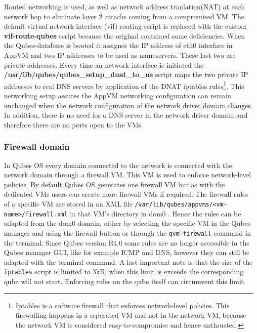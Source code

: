 \documentclass[runningheads,a4paper]{article}
\begin{document}
Routed networking is used, as well as  network address tranlation(NAT)
at each network hop to eliminate layer 2 attacks coming from a
compromised VM. The default virtual network interface (vif) routing
script is replaced with the custom \textbf{vif-route-qubes} script
because the original contained some deficiencies. When the
Qubes-database is booted it assignes the IP address of eth0 interface
in AppVM and two IP addresses to be used as nameservers. These last
two are private addresses. Every time an network interface is
initiated the \textbf{/usr/lib/qubes/qubes\_setup\_dnat\_to\_ns} script
maps the two private IP addresses to real DNS servers by application
of the DNAT iptables rules\footnote{Iptables is a software firewall that
enforces network-level policies. This firewalling happens in a
seperated VM and not in the network VM, because the network VM is
considered easy-to-compromise and hence unthrusted.}. This networking
setup assures the AppVM networking configuration can remain unchanged
when the network configuration of the network driver domain
changes. In addition, there is no need for a DNS server in the network
driver domain and therefore there are no ports open to the VMs.

\subsubsection{Firewall domain}

In Qubes OS every domain connected to the network is connected with
the network domain through a firewall VM. This VM is used to enforce
network-level policies. By default Qubes OS generates one firewall VM
but as with the dedicated VMs users can create more firewall VMs if
required. The firewall rules of a specific VM are stored in an XML
file \texttt{/var/lib/qubes/appvms/<vm-name>/firewall.xml} in that VM's
directory in dom0 . Hence the rules can be adapted from the dom0
domain, either by selecting the specific VM in the Qubes manager and
using the firewall button or through the \texttt{qvm-firewall} command
in the terminal. Since Qubes version R4.0 some rules are no longer
accessible in the Qubes manager GUI, like for example ICMP and DNS,
however they can still be adapted with the terminal command. A last
important note is that the size of the \texttt{iptables} script is
limited to 3kB, when this limit is exceede the corresponding qube will
not start. Enforcing rules on the qube itself can circumvent this
limit.
\end{document}
